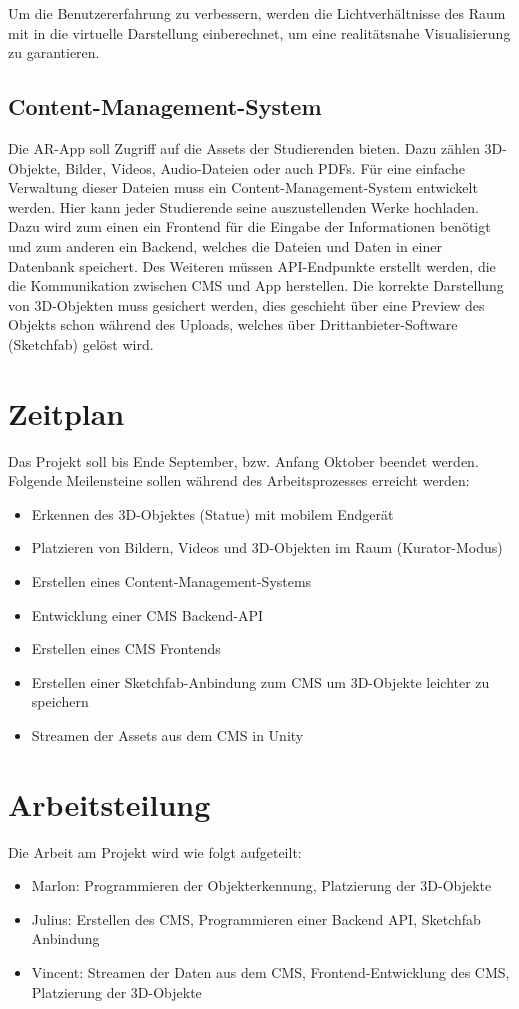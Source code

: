 \documentclass[pdftex,10pt,a4paper,oneside]{article}
\numberwithin{equation}{section} %
\begin{document}
Um die Benutzererfahrung zu verbessern, werden die Lichtverhältnisse des Raum mit in die virtuelle Darstellung einberechnet, um eine realitätsnahe Visualisierung zu garantieren.

\subsection{Content-Management-System}

Die AR-App soll Zugriff auf die Assets der Studierenden bieten. Dazu zählen 3D-Objekte, Bilder, Videos, Audio-Dateien oder auch PDFs. Für eine einfache Verwaltung dieser Dateien muss ein Content-Management-System entwickelt werden.
Hier kann jeder Studierende seine auszustellenden Werke hochladen. Dazu wird zum einen ein Frontend für die Eingabe der Informationen benötigt und zum anderen ein Backend, welches die Dateien und Daten in einer Datenbank speichert.
Des Weiteren müssen API-Endpunkte erstellt werden, die die Kommunikation zwischen CMS und App herstellen.
Die korrekte Darstellung von 3D-Objekten muss gesichert werden, dies geschieht über eine Preview des Objekts schon während des Uploads, welches über Drittanbieter-Software (Sketchfab) gelöst wird.

\section{Zeitplan}
Das Projekt soll bis Ende September, bzw. Anfang Oktober beendet werden. Folgende Meilensteine sollen während des Arbeitsprozesses erreicht werden:
\begin{itemize}
    \item Erkennen des 3D-Objektes (Statue) mit mobilem Endgerät
    \item Platzieren von Bildern, Videos und 3D-Objekten im Raum (Kurator-Modus)
    \item Erstellen eines Content-Management-Systems
    \item Entwicklung einer CMS Backend-API
    \item Erstellen eines CMS Frontends
    \item Erstellen einer Sketchfab-Anbindung zum CMS um 3D-Objekte leichter zu speichern
    \item Streamen der Assets aus dem CMS in Unity
\end{itemize}
\section{Arbeitsteilung}
Die Arbeit am Projekt wird wie folgt aufgeteilt:
\begin{itemize}
    \item Marlon: Programmieren der Objekterkennung, Platzierung der 3D-Objekte
    \item Julius: Erstellen des CMS, Programmieren einer Backend API, Sketchfab Anbindung
    \item Vincent: Streamen der Daten aus dem CMS, Frontend-Entwicklung des CMS, Platzierung der 3D-Objekte
\end{itemize}
\end{document}
